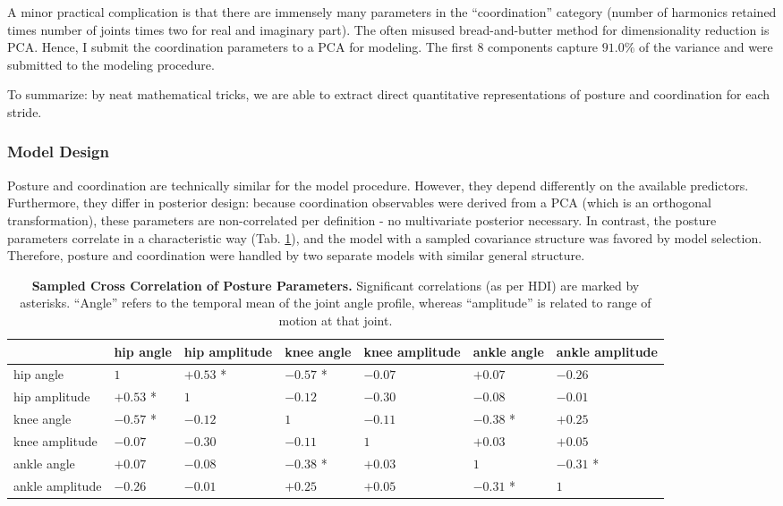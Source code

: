 A minor practical complication is that there are immensely many parameters in the ``coordination'' category (number of harmonics retained times number of joints times two for real and imaginary part).
The often misused bread-and-butter method for dimensionality reduction is PCA.
Hence, I submit the coordination parameters to a PCA for modeling.
The first \(8\) components capture \(91.0 \%\) of the variance and were submitted to the modeling procedure.


To summarize: by neat mathematical tricks, we are able to extract direct quantitative representations of posture and coordination for each stride.


\subsubsection{Model Design}
\label{sec:orga2e576d}
Posture and coordination are technically similar for the model procedure.
However, they depend differently on the available predictors.
Furthermore, they differ in posterior design: because coordination observables were derived from a PCA (which is an orthogonal transformation), these parameters are non-correlated per definition - no multivariate posterior necessary.
In contrast, the posture parameters correlate in a characteristic way (Tab. \ref{tab:posturecorrelation}), and the model with a sampled covariance structure was favored by model selection.
Therefore, posture and coordination were handled by two separate models with similar general structure.

\begin{table}[htbp]
\caption{\label{tab:posturecorrelation}\textbf{Sampled Cross Correlation of Posture Parameters.} Significant correlations (as per HDI) are marked by asterisks. ``Angle'' refers to the temporal mean of the joint angle profile, whereas ``amplitude'' is related to range of motion at that joint.}
\centering
\begin{tabular}{lllllll}
 & hip angle & hip amplitude & knee angle & knee amplitude & ankle angle & ankle amplitude\\[0pt]
\hline
hip angle & \(1\) & \(+0.53\) * & \(-0.57\) * & \(-0.07\) & \(+0.07\) & \(-0.26\)\\[0pt]
hip amplitude & \(+0.53\) * & \(1\) & \(-0.12\) & \(-0.30\) & \(-0.08\) & \(-0.01\)\\[0pt]
knee angle & \(-0.57\) * & \(-0.12\) & \(1\) & \(-0.11\) & \(-0.38\) * & \(+0.25\)\\[0pt]
knee amplitude & \(-0.07\) & \(-0.30\) & \(-0.11\) & \(1\) & \(+0.03\) & \(+0.05\)\\[0pt]
ankle angle & \(+0.07\) & \(-0.08\) & \(-0.38\) * & \(+0.03\) & \(1\) & \(-0.31\) *\\[0pt]
ankle amplitude & \(-0.26\) & \(-0.01\) & \(+0.25\) & \(+0.05\) & \(-0.31\) * & \(1\)\\[0pt]
\end{tabular}
\end{table}


